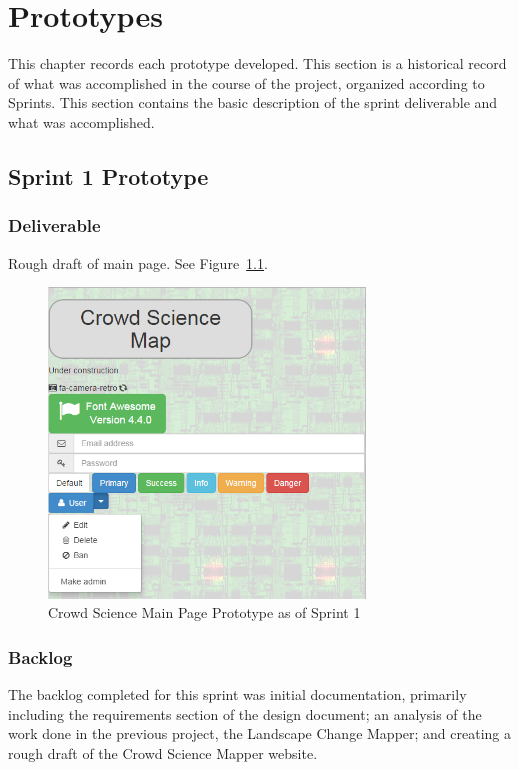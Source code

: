 

\chapter{Prototypes}

This chapter records each prototype developed.  This section is a historical record of what was accomplished in the course of the project, organized according to Sprints.  This section contains the basic description of the sprint deliverable and what was accomplished.  

\section{Sprint 1 Prototype}
\subsection{Deliverable}
Rough draft of main page. See Figure~\ref{prototype_S1_main}.

\begin{figure}[tbh]
\begin{center}
\includegraphics[width=0.75\textwidth]{./figures/prototype_S1_main.png}
\end{center}
\caption{Crowd Science Main Page Prototype as of Sprint 1\label{prototype_S1_main}}
\end{figure}

\subsection{Backlog}
The backlog completed for this sprint was initial documentation, primarily including the requirements section of the design document; an analysis of the work done in the previous project, the Landscape Change Mapper; and creating a rough draft of the Crowd Science Mapper website.
